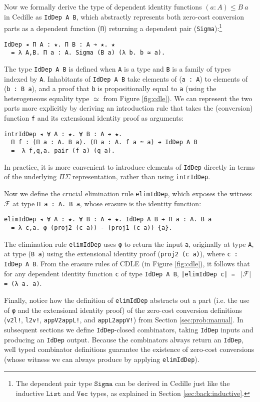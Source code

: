 \documentclass[acmsmall,screen]{acmart}
\newcommand{\refsec}[1]{Section \ref{sec:#1}}
\newcommand{\reffig}[1]{Figure \ref{fig:#1}}
\newcommand{\txt}[1]{\ensuremath{\texttt{#1}}}
\begin{document}
Now we formally derive the type of dependent identity functions $(a :
A) \leq B~a$ in Cedille as \verb;IdDep A B;,
which abstractly represents both zero-cost conversion
parts as a dependent function (\verb;Π;) returning a dependent pair
(\verb;Sigma;):\footnote{
  The dependent pair type \txt{Sigma} can be derived in Cedille just
  like the inductive \txt{List} and \txt{Vec} types, as explained in
  \refsec{back:inductive}.
  }
\begin{verbatim}
IdDep ◂ Π A : ★. Π B : A ➔ ★. ★
  = λ A,B. Π a : A. Sigma (B a) (λ b. b ≃ a).
\end{verbatim}
The type \verb;IdDep A B; is defined when \verb;A; is a type and
\verb;B; is a family of types indexed by \verb;A;. Inhabitants of
\verb;IdDep A B; take elements of (\verb;a : A;) to elements of
(\verb;b : B a;), and a proof that \verb;b; is propositionally equal
to \verb;a; (using the heterogeneous equality type
$\simeq$
from \reffig{cdle}).
We can represent the two parts more explicitly by deriving
an introduction rule that takes the (conversion) function \verb;f; and
its extensional identity proof as arguments:
\begin{verbatim}
intrIdDep ◂ ∀ A : ★. ∀ B : A ➔ ★. 
  Π f : (Π a : A. B a). (Π a : A. f a ≃ a) ➔ IdDep A B 
  =  λ f,q,a. pair (f a) (q a).
\end{verbatim}
In practice, it is more convenient to introduce elements of
\verb;IdDep; directly in terms of the underlying $\Pi\Sigma$
representation, rather than using \verb;intrIdDep;.

Now we define the crucial elimination rule \verb;elimIdDep;, which exposes
the witness $\mathcal{F}$ at type \verb;Π a : A. B a;, whose erasure
is the identity function:
\begin{verbatim}
elimIdDep ◂ ∀ A : ★. ∀ B : A ➔ ★. IdDep A B ➔ Π a : A. B a
  = λ c,a. φ (proj2 (c a)) - (proj1 (c a)) {a}.
\end{verbatim}
The elimination rule \verb;elimIdDep; uses \verb;φ; to return the input
\verb;a;, originally at type \verb;A;, at type (\verb;B a;) using the
extensional identity proof (\verb;proj2 (c a);), where \verb;c : IdDep A B;.
From the erasure rules of CDLE (in \reffig{cdle}), it follows
that for any dependent identity function \verb;c; of type \verb;IdDep A B;,
\verb;|elimIdDep c| = ; $|\mathcal{F}|$ \verb; = (λ a. a);.

Finally, notice how the definition of
\verb;elimIdDep; abstracts out a part (i.e. the use of \verb;φ; and the
extensional identity proof) of the zero-cost
conversion definitions (\verb;v2l!;, \verb;l2v!;, \verb;appV2appL!;, and
\verb;appL2appV!;) from \refsec{prob:manual}. In subsequent sections
we define \verb;IdDep;-closed combinators, taking \verb;IdDep; inputs
and producing an \verb;IdDep; output. Because the combinators always
return an \verb;IdDep;, well typed combinator definitions guarantee
the existence of zero-cost conversions
(whose witness we can always produce by applying \verb;elimIdDep;).
\end{document}
